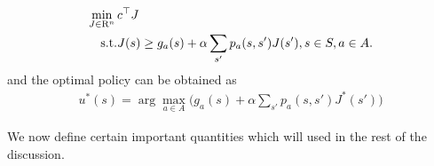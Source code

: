 \begin{align}\label{mdplp}
\min_{J\in \R^n}\, &c^\top J\\
\text{s.t.}\mb &J(s)\geq g_a(s)+\alpha\sum_{s'}p_a(s,s')J(s'), s\in S, a \in A.\nn
\end{align}
and the optimal policy can be obtained as 
\begin{align}
u^*(s)=\arg\max_{ a\in A}\big(g_a(s)+\alpha \sum_{s'}p_a(s,s')J^*(s')\big)
\end{align}
\begin{comment}
The LP formulation in \eqref{mdplp} can also be represented in short by either of the below linear programs (which are idential but differ in notation),\begin{minipage}{.5\columnwidth}
\begin{align}\label{mdplpshort}
\begin{split}
\min_{J\in \R^n}\, &c^\top J\\
\text{s.t.}\mb &J\geq T J,
\end{split}
\end{align}
\end{minipage}%
\begin{minipage}{.5\columnwidth}
\begin{align}
\begin{split}
\min_{J\in \R^n}\, &c^\top J\\
\text{s.t.}\mb &EJ\geq H J,
\end{split}
\end{align}
\end{minipage}\\
\end{comment}
We now define certain important quantities which will used in the rest of the discussion.
